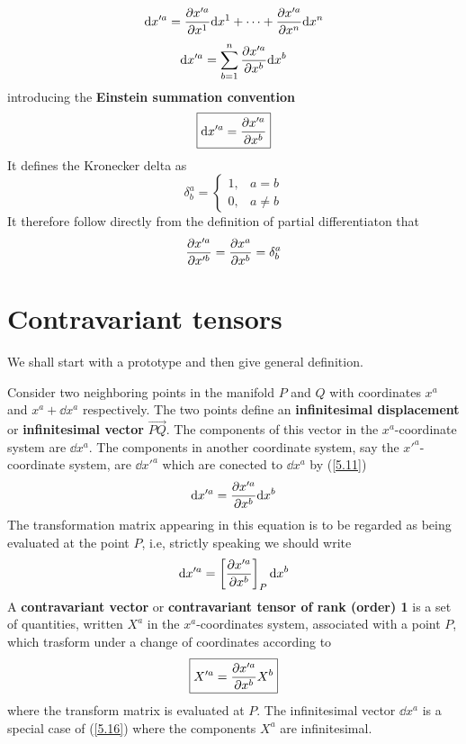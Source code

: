 \begin{equation*}
  \dd x'^{a}=\pdv{x'^{a}}{x^1}\dd x^1+\cdots +\pdv{x'^{a}}{x^n}\dd x^n
\end{equation*}
\begin{equation}                                   \label{5.10}
  \dd x'^{a} =\sum_{b=1}^n\pdv{x'^{a}}{x^b}\dd x^b 
\end{equation}
introducing the \textbf{Einstein summation convention}
\begin{equation}                   \label{5.11}
  \boxed{\dd x'^{a}=\pdv{x'^{a}}{x^b}}
\end{equation}
It defines the Kronecker delta as
\begin{equation}
  \delta_b^{a}=\left\{ \begin{array}{lc}
    1 ,& a=b\\
  0 ,& a\neq b\end{array}\right.
\end{equation}
It therefore follow directly from the definition of partial differentiaton that
\begin{equation}                                \label{5.13}
  \pdv{x'^{a}}{x'^b}=\pdv{x^{a}}{x^b}=\delta_b^{a}
\end{equation}

\section{Contravariant tensors}\label{sec:5.5}
We shall start with a prototype and then give general definition.

Consider two neighboring points in the manifold $P$ and $Q$ with coordinates $x^{a}$ and $x^{a}+\dd x^{a}$  respectively. The two points define an \textbf{infinitesimal displacement} or \textbf{infinitesimal vector} $\overrightarrow{PQ}$. The components of this vector in the $x^{a}$-coordinate system are $\dd x^{a}$. The components in another coordinate system, say the $x'^{a}$-coordinate system, are $\dd x'^{a}$ which are conected to $\dd x^{a}$ by (\ref{5.11})
\begin{equation}\label{4.14}
  \dd x'^{a}=\pdv{x'^{a}}{x^b}\dd x^b
\end{equation}
The transformation matrix appearing in this equation is to be regarded as being evaluated at the point $P$, i.e, strictly speaking we should write 
\begin{equation}\label{5.15}
  \dd x'^{a}=\left[\pdv{x'^{a}}{x^b}\right]_P\dd x^b 
\end{equation}
A \textbf{contravariant vector} or \textbf{contravariant tensor of rank (order) 1} is a set of quantities, written $X^{a}$ in the $x^{a}$-coordinates system, associated with a point $P$, which trasform under a change of coordinates according to
\begin{equation}\label{5.16}
  \boxed{X'^{a}=\pdv{x'^{a}}{x^b}X^b }
\end{equation}
where the transform matrix is evaluated at $P$. The infinitesimal vector $\dd x^{a}$ is a special case of (\ref{5.16}) where the components $X^{a}$ are infinitesimal. 

